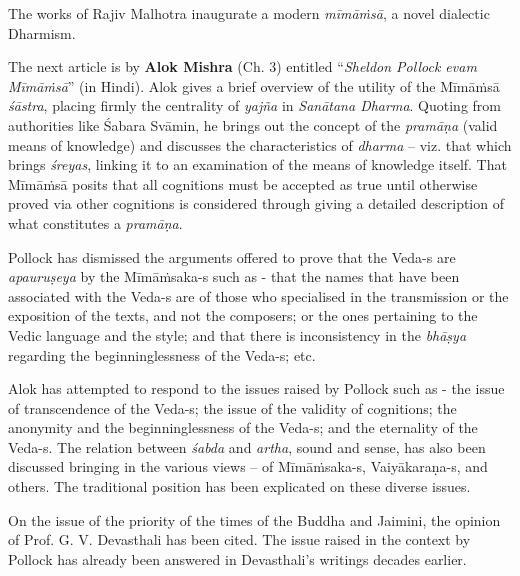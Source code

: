 The works of Rajiv Malhotra inaugurate a modern \textit{mīmāṁsā}, a novel dialectic Dharmism.

The next article is by \textbf{Alok Mishra} (Ch. 3) entitled “\textit{Sheldon Pollock evam Mīmāṁsā}” (in Hindi). Alok gives a brief overview of the utility of the Mīmāṁsā \textit{śāstra}, placing firmly the centrality of \textit{yajña} in \textit{Sanātana Dharma}. Quoting from authorities like Śabara Svāmin, he brings out the concept of the \textit{pramāṇa} (valid means of knowledge) and discusses the characteristics of \textit{dharma} – viz. that which brings \textit{śreyas}, linking it to an examination of the means of knowledge itself. That Mīmāṁsā posits that all cognitions must be accepted as true until otherwise proved via other cognitions is considered through giving a detailed description of what constitutes a \textit{pramāṇa}.

Pollock has dismissed the arguments offered to prove that the Veda-s are \textit{apauruṣeya} by the Mīmāṁsaka-s such as - that the names that have been associated with the Veda-s are of those who specialised in the transmission or the exposition of the texts, and not the composers; or the ones pertaining to the Vedic language and the style; and that there is inconsistency in the \textit{bhāṣya} regarding the beginninglessness of the Veda-s; etc.

Alok has attempted to respond to the issues raised by Pollock such as - the issue of transcendence of the Veda-s; the issue of the validity of cognitions; the anonymity and the beginninglessness of the Veda-s; and the eternality of the Veda-s. The relation between \textit{śabda} and \textit{artha}, sound and sense, has also been discussed bringing in the various views – of Mīmāṁsaka-s, Vaiyākaraṇa-s, and others. The traditional position has been explicated on these diverse issues.

On the issue of the priority of the times of the Buddha and Jaimini, the opinion of Prof. G. V. Devasthali has been cited. The issue raised in the context by Pollock has already been answered in Devasthali’s writings decades earlier. 

